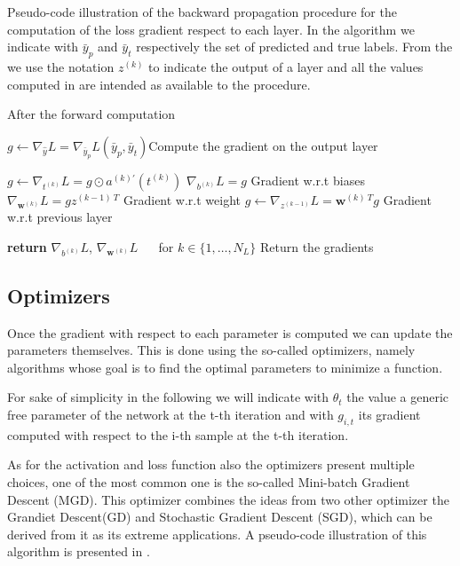 \begin{algorithm}[H]
\caption{Pseudo-code illustration of the backward propagation procedure for the computation of the loss gradient respect to each layer. In the algorithm we indicate with $\bar{y}_p$ and $\bar{y}_t$ respectively the set of predicted and true labels. From the  we use the notation $z^{(k)}$ to indicate the output of a layer and all the values computed in  are intended as available to the procedure.}
\label{alg:back_comp}
\begin{algorithmic}[1]

 \Comment After the forward computation

\State $g \gets \nabla_{\hat{y}}L = \nabla_{\bar{y}_p}L(\bar{y}_p,\bar{y}_t)$\Comment Compute the gradient on the output layer

\State $g \gets \nabla_{t^{(k)}}L = g \odot a^{(k)\prime}(t^{(k)})$
\State $\nabla_{b^{(k)}}L = g$ \Comment Gradient w.r.t biases
\State $\nabla_{\mathbf{w}^{(k)}}L = g z^{(k-1)~T}$ \Comment Gradient w.r.t weight
\State $g \gets \nabla_{z^{(k-1)}}L = \mathbf{w}^{(k)~T} g$ \Comment Gradient w.r.t previous layer
\EndFor

\State \textbf{return} $\nabla_{b^{(k)}}L$, $\nabla_{\mathbf{w}^{(k)}}L$ $\quad$ for $k \in \{1,\dots,N_L\}$ \Comment Return the gradients
\EndProcedure
\end{algorithmic}
\end{algorithm}



\subsection{Optimizers}\label{optalg}

Once the gradient with respect to each parameter is computed we can update the parameters themselves. This is done using the so-called optimizers, namely algorithms whose goal is to find the optimal parameters to minimize a function.

For sake of simplicity in the following we will indicate with $\theta_t$ the value a generic free parameter of the network at the t-th iteration and with $g_{i,t}$ its gradient computed with respect to the i-th sample at the t-th iteration.

As for the activation and loss function also the optimizers present multiple choices, one of the most common one is the so-called Mini-batch Gradient Descent (MGD). This optimizer combines the ideas from two other optimizer the Grandiet Descent(GD) and Stochastic Gradient Descent (SGD), which can be derived from it as its extreme applications. A pseudo-code illustration of this algorithm is presented in .

